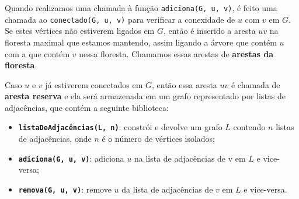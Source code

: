 Quando realizamos uma chamada à função \texttt{adiciona(G, u, v)}, é feito uma chamada ao \texttt{conectado(G, u, v)} para verificar a conexidade de $u$ com $v$ em $G$. Se estes vértices não estiverem ligados em $G$, então é inserido a aresta $uv$ na floresta maximal que estamos mantendo, assim ligando a árvore que contém $u$ com a que contém $v$ nessa floresta. Chamamos essas arestas de \textbf{arestas da floresta}.

Caso $u$ e $v$ já estiverem conectados em $G$, então essa aresta $uv$ é chamada de \textbf{aresta reserva} e ela será armazenada em um grafo representado por listas de adjacências, que contém a seguinte biblioteca:

\begin{itemize}
    \item \texttt{\textbf{listaDeAdjacências(L, n)}}: constrói e devolve um grafo $L$ contendo $n$ listas de adjacências, onde $n$ é o número de vértices isolados;
    \item \texttt{\textbf{adiciona(G, u, v)}}: adiciona $u$ na lista de adjacências de v em $L$ e vice-versa;
    \item \texttt{\textbf{remova(G, u, v)}}: remove $u$ da lista de adjacências de $v$ em $L$ e vice-versa.
\end{itemize} 